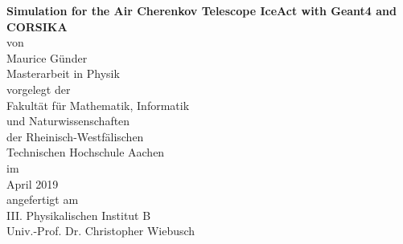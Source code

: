 \begin{titlepage}
\addtolength{\oddsidemargin}{4mm}
\begin{center}

\Large
\textbf{Simulation for the Air Cherenkov Telescope IceAct with Geant4 and CORSIKA} \\[15mm]

{\large von}\\[1mm]
\Large
Maurice Günder\\[18mm]

Masterarbeit in Physik\\[18mm]

{\large vorgelegt der}\\[1mm]
Fakultät für Mathematik, Informatik \\ 
und Naturwissenschaften \\ 
der Rheinisch-Westfälischen \\ Technischen Hochschule Aachen\\[15mm]

{\large im}\\[1mm]
April 2019\\[18mm]

{\large angefertigt am}\\[1mm]
III. Physikalischen Institut B \\ Univ.-Prof. Dr. Christopher Wiebusch\\[18mm]

\end{center}
\end{titlepage}